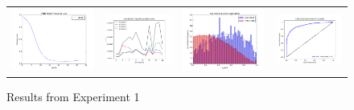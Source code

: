\documentclass{sigkddExp}
\begin{document}
\begin{figure}[h]
\begin{tabular}{cccc}
    \includegraphics[width=0.5\columnwidth]{img/cnn_training_loss_toy}
&   \includegraphics[width=0.5\columnwidth]{img/cnn_domain_transfer_adversarial_gradient_norm}
&   \includegraphics[width=0.5\columnwidth]{img/domain_transfer_direct_lstm_hist}
&   \includegraphics[width=0.5\columnwidth]{img/cnn_domain_transfer_adversarial_lstm}
\end{tabular}
\label{fig:len_hist}
\caption{Results from Experiment 1}
\end{figure}
\end{document}
